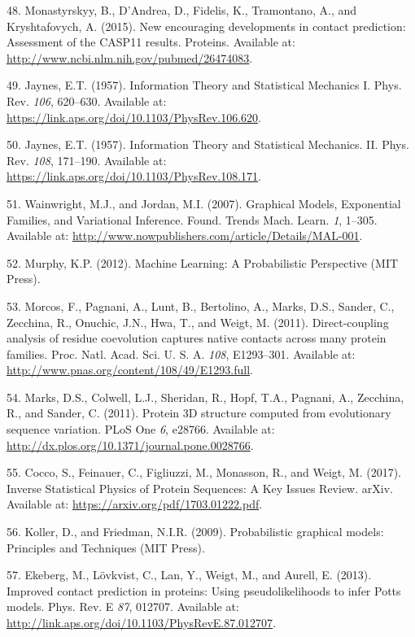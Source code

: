 \documentclass[12pt,a4paper,twoside]{book}
\theoremstyle{definition}
\theoremstyle{definition}
\theoremstyle{remark}
\begin{document}
\hypertarget{ref-Monastyrskyy2015}{}
48. Monastyrskyy, B., D'Andrea, D., Fidelis, K., Tramontano, A., and
Kryshtafovych, A. (2015). New encouraging developments in contact
prediction: Assessment of the CASP11 results. Proteins. Available at:
\url{http://www.ncbi.nlm.nih.gov/pubmed/26474083}.

\hypertarget{ref-Jaynes1957a}{}
49. Jaynes, E.T. (1957). Information Theory and Statistical Mechanics I.
Phys. Rev. \emph{106}, 620--630. Available at:
\url{https://link.aps.org/doi/10.1103/PhysRev.106.620}.

\hypertarget{ref-Jaynes1957b}{}
50. Jaynes, E.T. (1957). Information Theory and Statistical Mechanics.
II. Phys. Rev. \emph{108}, 171--190. Available at:
\url{https://link.aps.org/doi/10.1103/PhysRev.108.171}.

\hypertarget{ref-Wainwright2007}{}
51. Wainwright, M.J., and Jordan, M.I. (2007). Graphical Models,
Exponential Families, and Variational Inference. Found. Trends Mach.
Learn. \emph{1}, 1--305. Available at:
\url{http://www.nowpublishers.com/article/Details/MAL-001}.

\hypertarget{ref-Murphy2012}{}
52. Murphy, K.P. (2012). Machine Learning: A Probabilistic Perspective
(MIT Press).

\hypertarget{ref-Morcos2011}{}
53. Morcos, F., Pagnani, A., Lunt, B., Bertolino, A., Marks, D.S.,
Sander, C., Zecchina, R., Onuchic, J.N., Hwa, T., and Weigt, M. (2011).
Direct-coupling analysis of residue coevolution captures native contacts
across many protein families. Proc. Natl. Acad. Sci. U. S. A.
\emph{108}, E1293--301. Available at:
\url{http://www.pnas.org/content/108/49/E1293.full}.

\hypertarget{ref-Marks2011}{}
54. Marks, D.S., Colwell, L.J., Sheridan, R., Hopf, T.A., Pagnani, A.,
Zecchina, R., and Sander, C. (2011). Protein 3D structure computed from
evolutionary sequence variation. PLoS One \emph{6}, e28766. Available
at: \url{http://dx.plos.org/10.1371/journal.pone.0028766}.

\hypertarget{ref-Cocco2017}{}
55. Cocco, S., Feinauer, C., Figliuzzi, M., Monasson, R., and Weigt, M.
(2017). Inverse Statistical Physics of Protein Sequences: A Key Issues
Review. arXiv. Available at: \url{https://arxiv.org/pdf/1703.01222.pdf}.

\hypertarget{ref-Koller2009}{}
56. Koller, D., and Friedman, N.I.R. (2009). Probabilistic graphical
models: Principles and Techniques (MIT Press).

\hypertarget{ref-Ekeberg2013}{}
57. Ekeberg, M., Lövkvist, C., Lan, Y., Weigt, M., and Aurell, E.
(2013). Improved contact prediction in proteins: Using pseudolikelihoods
to infer Potts models. Phys. Rev. E \emph{87}, 012707. Available at:
\url{http://link.aps.org/doi/10.1103/PhysRevE.87.012707}.
\end{document}
